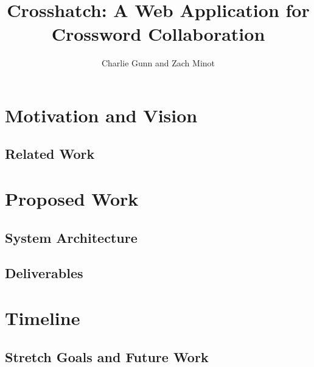 \documentclass{article}
\author{Charlie Gunn and Zach Minot}
\title{Crosshatch: A Web Application for Crossword Collaboration}
\begin{document}
\maketitle

\section{Motivation and Vision}
\subsection{Related Work}

\section{Proposed Work}
\subsection{System Architecture}




\subsection{Deliverables}

\section{Timeline}

\subsection{Stretch Goals and Future Work}

\newpage


\end{document}
